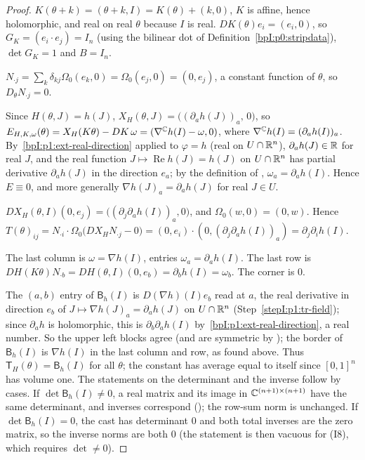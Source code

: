 \begin{proof}
\label{stepI:p1:tr-torus}
$K(\theta+k)=(\theta+k,I)=K(\theta)+(k,0)$, $K$ is affine, hence holomorphic, and real on real $\theta$ because $I$
is real. $DK(\theta)e_i=(e_i,0)$, so $G_K=(e_i\cdot e_j)=I_n$ (using the bilinear dot of
Definition~\ref{bpI:p0:stripdata}), $\det G_K=1$ and $B=I_n$.

\label{stepI:p1:tr-frame}
$N_{\cdot j}=\sum_k\delta_{kj}\Omega_0(e_k,0)=\Omega_0(e_j,0)=(0,e_j)$, a constant function of $\theta$, so
$D_\theta N_{\cdot j}=0$.

\label{stepI:p1:tr-field}
Since $H(\theta,J)=h(J)$, $X_H(\theta,J)=\bigl((\partial_ah(J))_a,\,0\bigr)$, so $E_{H,K,\omega}(\theta)=X_H(K\theta)-DK\,\omega=
(\nabla^{\mathbb{C}}h(I)-\omega,0)$, where $\nabla^{\mathbb{C}} h(I)=(\partial_ah(I))_a$. By~\ref{bpI:p1:ext-real-direction} applied to
$\varphi=h$ (real on $U\cap\mathbb{R}^n$), $\partial_ah(J)\in\mathbb{R}$ for real $J$, and the real function
$J\mapsto\operatorname{Re}h(J)=h(J)$ on $U\cap\mathbb{R}^n$ has partial derivative $\partial_ah(J)$ in the direction $e_a$; by the
definition of , $\omega_a=\partial_ah(I)$. Hence $E\equiv0$, and more generally
$\nabla h(J)_a=\partial_ah(J)$ for real $J\in U$.

\label{stepI:p1:tr-torsion}
$DX_H(\theta,I)(0,e_j)=\bigl((\partial_j\partial_ah(I))_a,0\bigr)$, and $\Omega_0(w,0)=(0,w)$. Hence
$T(\theta)_{ij}=N_{\cdot i}\cdot\Omega_0\bigl(DX_H N_{\cdot j}-0\bigr)=(0,e_i)\cdot(0,(\partial_j\partial_ah(I))_a)=\partial_j\partial_ih(I)$.

\label{stepI:p1:tr-border}
The last column is $\omega=\nabla h(I)$, entries $\omega_a=\partial_ah(I)$. The last row is
$DH(K\theta)N_{\cdot b}=DH(\theta,I)(0,e_b)=\partial_bh(I)=\omega_b$. The corner is $0$.

\label{stepI:p1:tr-compare}
The $(a,b)$ entry of $\mathsf B_h(I)$ is $D(\nabla h)(I)e_b$ read at $a$, the real derivative in direction $e_b$ of
$J\mapsto\nabla h(J)_a=\partial_ah(J)$ on $U\cap\mathbb{R}^n$ (Step~\ref{stepI:p1:tr-field}); since $\partial_ah$ is holomorphic,
this is $\partial_b\partial_ah(I)$ by~\ref{bpI:p1:ext-real-direction}, a real number. So the upper left blocks agree
(and are symmetric by ); the border of $\mathsf B_h(I)$ is $\nabla h(I)$ in the
last column and row, as found above. Thus $\mathsf T_H(\theta)=\mathsf B_h(I)$ for all $\theta$; the constant has
average equal to itself since $[0,1]^n$ has volume one. The statements on the determinant and the inverse follow by cases. If $\det\mathsf B_h(I)\ne0$, a real matrix and its image in $\mathbb{C}^{(n+1)\times(n+1)}$ have the same determinant, and inverses correspond
(); the row-sum norm is unchanged. If $\det\mathsf B_h(I)=0$, the cast has determinant $0$ and both total inverses are the zero matrix, so the inverse norms are both $0$ (the statement is then vacuous for (I8), which requires $\det\ne0$).
\end{proof}

